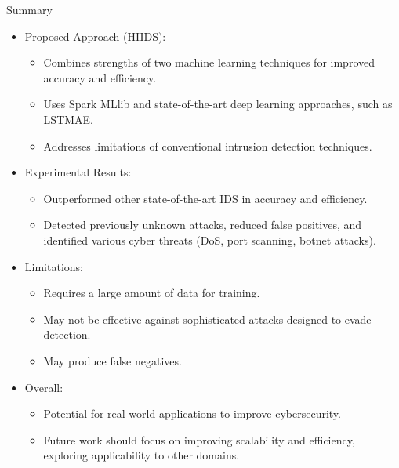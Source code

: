 \documentclass{beamer}
\begin{document}
\begin{frame}{Summary}
  

  \begin{itemize}
    \item Proposed Approach (HIIDS):
      \begin{itemize}
        \item Combines strengths of two machine learning techniques for improved accuracy and efficiency.
        \item Uses Spark MLlib and state-of-the-art deep learning approaches, such as LSTMAE.
        \item Addresses limitations of conventional intrusion detection techniques.
      \end{itemize}
    \item Experimental Results:
      \begin{itemize}
        \item Outperformed other state-of-the-art IDS in accuracy and efficiency.
        \item Detected previously unknown attacks, reduced false positives, and identified various cyber threats (DoS, port scanning, botnet attacks).
      \end{itemize}
    \item Limitations:
      \begin{itemize}
        \item Requires a large amount of data for training.
        \item May not be effective against sophisticated attacks designed to evade detection.
        \item May produce false negatives.
      \end{itemize}
    \item Overall:
      \begin{itemize}
        \item Potential for real-world applications to improve cybersecurity.
        \item Future work should focus on improving scalability and efficiency, exploring applicability to other domains.
      \end{itemize}
  \end{itemize}
\end{frame}
\end{document}
